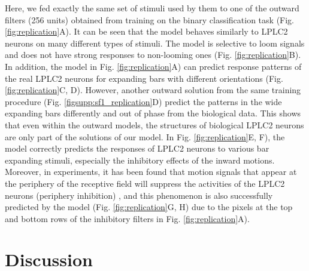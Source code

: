 \documentclass[pdftex,9pt,lineno]{elife}
\begin{document}
Here, we fed exactly the same set of stimuli used by them to one of the outward filters (256 units) obtained from training on the binary classification task (Fig. \ref{fig:replication}A). It can be seen that the model behaves similarly to LPLC2 neurons on many different types of stimuli. The model is selective to loom signals and does not have strong responses to non-looming ones (Fig. \ref{fig:replication}B). In addition, the model in Fig. \ref{fig:replication}A) can predict response patterns of the real LPLC2 neurons for expanding bars with different orientations (Fig. \ref{fig:replication}C, D). However, another outward solution from the same training procedure (Fig. \ref{figsupp:sf1_replication}D) predict the patterns in the wide expanding bars differently and out of phase from the biological data. This shows that even within the outward models, the structures of biological LPLC2 neurons are only part of the solutions of our model. In Fig. \ref{fig:replication}E, F), the model correctly predicts the responses of LPLC2 neurons to various bar expanding stimuli, especially the inhibitory effects of the inward motions. Moreover, in experiments, it has been found that motion signals that appear at the periphery of the receptive field will suppress the activities of the LPLC2 neurons (periphery inhibition) \citep{klapoetke2017ultra}, and this phenomenon is also successfully predicted by the model (Fig. \ref{fig:replication}G, H) due to the pixels at the top and bottom rows of the inhibitory filters in Fig. \ref{fig:replication}A).


\section{Discussion}

\end{document}
